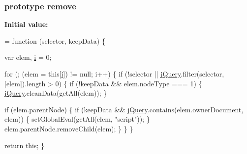 \subsubsection[{\texorpdfstring{remove}{remove}}]{ {\bf prototype} remove}\hypertarget{jquery-2_82_81-vsdoc_8js_a2bed23308c25c53346bbe769c1f6f9a5}{}\label{jquery-2_82_81-vsdoc_8js_a2bed23308c25c53346bbe769c1f6f9a5}
{\bfseries Initial value\+:}
\begin{DoxyCode}
= \textcolor{keyword}{function} (selector, keepData) \{
        

        var elem,
            \hyperlink{geolocation-marker_8js_a0325b7ce0988782a8032e720ef3aa411}{i} = 0;

        \textcolor{keywordflow}{for} (; (elem = \textcolor{keyword}{this}[\hyperlink{geolocation-marker_8js_a0325b7ce0988782a8032e720ef3aa411}{i}]) != null; i++) \{
            \textcolor{keywordflow}{if} (!selector || \hyperlink{jquery-2_82_81-vsdoc_8js_add5237586d970a38a81f990e8eb28c6c}{jQuery}.filter(selector, [elem]).length > 0) \{
                \textcolor{keywordflow}{if} (!keepData && elem.nodeType === 1) \{
                    \hyperlink{jquery-2_82_81-vsdoc_8js_add5237586d970a38a81f990e8eb28c6c}{jQuery}.cleanData(getAll(elem));
                \}

                \textcolor{keywordflow}{if} (elem.parentNode) \{
                    \textcolor{keywordflow}{if} (keepData && \hyperlink{jquery-2_82_81-vsdoc_8js_add5237586d970a38a81f990e8eb28c6c}{jQuery}.contains(elem.ownerDocument, elem)) \{
                        setGlobalEval(getAll(elem, \textcolor{stringliteral}{"script"}));
                    \}
                    elem.parentNode.removeChild(elem);
                \}
            \}
        \}

        \textcolor{keywordflow}{return} \textcolor{keyword}{this};
    \}
\end{DoxyCode}
